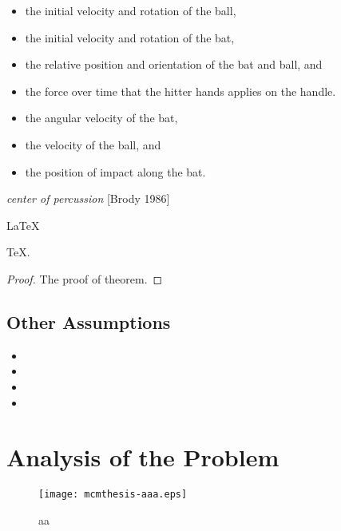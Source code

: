 \documentclass{mcmthesis}
\begin{document}
\begin{itemize}
\item the initial velocity and rotation of the ball,
\item the initial velocity and rotation of the bat,
\item the relative position and orientation of the bat and ball, and
\item the force over time that the hitter hands applies on the handle.
\end{itemize}
\begin{itemize}
\item the angular velocity of the bat,
\item the velocity of the ball, and
\item the position of impact along the bat.
\end{itemize}
\emph{center of percussion} [Brody 1986]

\begin{Theorem} \label{thm:latex}
\LaTeX
\end{Theorem}
\begin{Lemma} \label{thm:tex}
\TeX .
\end{Lemma}
\begin{proof}
The proof of theorem.
\end{proof}

\subsection{Other Assumptions}
\begin{itemize}
\item
\item
\item
\item
\end{itemize}

\begin{center}
\end{center}


\section{Analysis of the Problem}
\begin{figure}[h]
\small
\centering
\texttt{[image: mcmthesis-aaa.eps]}
\caption{aa} \label{fig:aa}
\end{figure}
\end{document}
